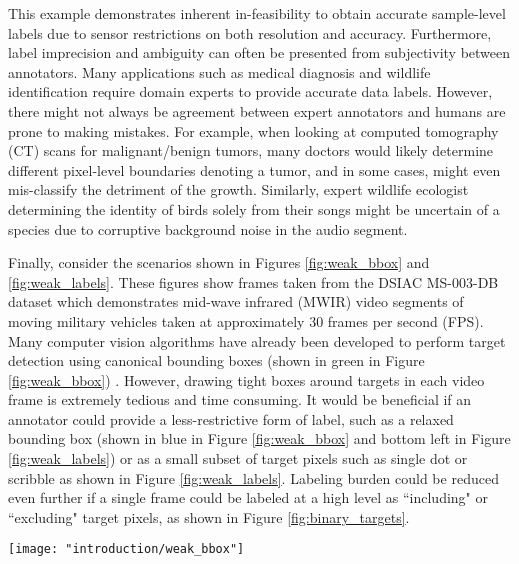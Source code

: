 This example demonstrates inherent in-feasibility to obtain accurate sample-level labels due to sensor restrictions on both resolution and accuracy.  Furthermore, label imprecision and ambiguity can often be presented from subjectivity between annotators. Many applications such as medical diagnosis and wildlife identification require domain experts to provide accurate data labels.  However, there might not always be agreement between expert annotators and humans are prone to making mistakes.  For example, when looking at computed tomography (CT) scans for malignant/benign tumors, many doctors would likely determine different pixel-level boundaries denoting a tumor, and in some cases, might even mis-classify the detriment of the growth.  Similarly, expert wildlife  ecologist determining the identity of birds solely from their songs might be uncertain of a species due to corruptive background noise in the audio segment.

Finally, consider the scenarios shown in Figures \ref{fig:weak_bbox} and \ref{fig:weak_labels}.  These figures show frames taken from the DSIAC MS-003-DB dataset which demonstrates mid-wave infrared (MWIR) video segments of moving military vehicles taken at approximately 30 frames per second (FPS).  Many computer vision algorithms have already been developed to perform target detection using canonical bounding boxes (shown in green in Figure \ref{fig:weak_bbox}) \cite{Redmon2018YOLOV3}.  However, drawing tight boxes around targets in each video frame is extremely tedious and time consuming.  It would be beneficial if an annotator could provide a less-restrictive form of label, such as a relaxed bounding box (shown in blue in Figure \ref{fig:weak_bbox} and bottom left in Figure \ref{fig:weak_labels}) or as a small subset of target pixels such as single dot or scribble as shown in Figure \ref{fig:weak_labels}.  Labeling burden could be reduced even further if a single frame could be labeled at a high level as ``including" or ``excluding" target pixels, as shown in Figure \ref{fig:binary_targets}. 


\begin{center}
	\begin{figure*}[h]
		\centering
		\texttt{[image: "introduction/weak\_bbox"]}
		\caption{A sample frame from the DSIAC  MS-003-DB MWIR dataset.  Two targets are shown with canonical bounding boxes (green) and relaxed bounding boxes (blue).  Red dots represent the centers of the target objects.}
		\label{fig:weak_bbox}
	\end{figure*}
\end{center}

